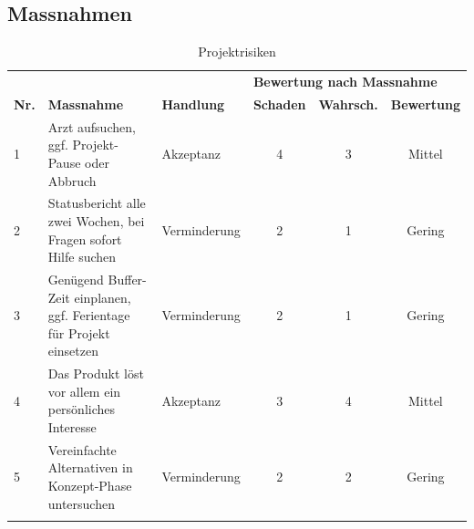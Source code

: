 \clearpage
\subsection{Massnahmen}\label{massnahmen}

\begin{longtable}[]{@{}lp{4.1cm}lccc@{}}
  \toprule
               &                                                                       &                   & \multicolumn{3}{l}{\textbf{Bewertung nach Massnahme}}\tabularnewline
  \textbf{Nr.} & \textbf{Massnahme}                                                    & \textbf{Handlung} & \textbf{Schaden}                                                     & \textbf{Wahrsch.} & \textbf{Bewertung}\tabularnewline
  \midrule
  \endhead
  1            & Arzt aufsuchen, ggf. Projekt-Pause oder Abbruch                       & Akzeptanz         & 4                                                                    & 3                 & Mittel\tabularnewline
  2            & Statusbericht alle zwei Wochen, bei Fragen sofort Hilfe suchen        & Verminderung      & 2                                                                    & 1                 & Gering\tabularnewline
  3            & Genügend Buffer-Zeit einplanen, ggf. Ferientage für Projekt einsetzen & Verminderung      & 2                                                                    & 1                 & Gering\tabularnewline
  4            & Das Produkt löst vor allem ein persönliches Interesse                 & Akzeptanz         & 3                                                                    & 4                 & Mittel\tabularnewline
  5            & Vereinfachte Alternativen in Konzept-Phase untersuchen                & Verminderung      & 2                                                                    & 2                 & Gering\tabularnewline
  \bottomrule
  \caption{Projektrisiken}
\end{longtable}



